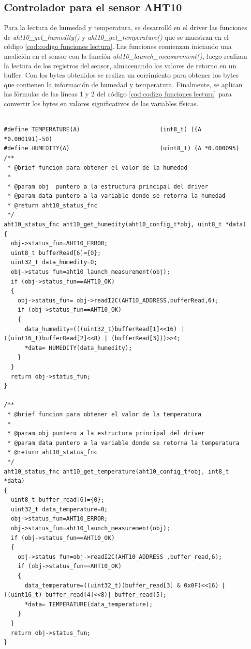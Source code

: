 \subsection{Controlador para el sensor AHT10} 

Para la lectura de humedad y temperatura, se desarrolló en el driver las funciones de \emph{aht10\_get\_humedity()} y \emph{aht10\_get\_temperature()} que se muestran en el código \ref{cod:codigo funciones lectura}.
Las funciones comienzan iniciando una medición en el sensor con la función \emph{aht10\_launch\_measurement()}, luego realizan la lectura de los registros del sensor, almacenando los valores de retorno en un buffer. Con los bytes obtenidos se realiza un corrimiento para  obtener los bytes que contienen la información de humedad y temperatura. Finalmente, se aplican las fórmulas de las líneas 1 y 2 del código \ref{cod:codigo funciones lectura} para convertir los bytes en valores significativos de las variables físicas.
 
\begin{lstlisting}[label=cod:codigo funciones lectura ,caption=Funciones de lectura de humedad y temperatura.]  % Start your code-block

#define TEMPERATURE(A)                       (int8_t) ((A *0.000191)-50)       
#define HUMEDITY(A)                          (uint8_t) (A *0.000095)        
/**
 * @brief funcion para obtener el valor de la humedad
 * 
 * @param obj  puntero a la estructura principal del driver 
 * @param data puntero a la variable donde se retorna la humedad
 * @return aht10_status_fnc 
 */
aht10_status_fnc aht10_get_humedity(aht10_config_t*obj, uint8_t *data)
{
  obj->status_fun=AHT10_ERROR;
  uint8_t bufferRead[6]={0};
  uint32_t data_humedity=0;
  obj->status_fun=aht10_launch_measurement(obj);
  if (obj->status_fun==AHT10_OK)
  {
    obj->status_fun= obj->readI2C(AHT10_ADDRESS,bufferRead,6);
    if (obj->status_fun==AHT10_OK)
    {
      data_humedity=(((uint32_t)bufferRead[1]<<16) | ((uint16_t)bufferRead[2]<<8) | (bufferRead[3]))>>4;
      *data= HUMEDITY(data_humedity);
    }
  }
  return obj->status_fun;
}

/**
 * @brief funcion para obtener el valor de la temperatura
 * 
 * @param obj puntero a la estructura principal del driver 
 * @param data puntero a la variable donde se retorna la temperatura
 * @return aht10_status_fnc 
 */
aht10_status_fnc aht10_get_temperature(aht10_config_t*obj, int8_t *data)
{
  uint8_t buffer_read[6]={0};
  uint32_t data_temperature=0;
  obj->status_fun=AHT10_ERROR;
  obj->status_fun=aht10_launch_measurement(obj);
  if (obj->status_fun==AHT10_OK)
  {
    obj->status_fun=obj->readI2C(AHT10_ADDRESS ,buffer_read,6);
    if (obj->status_fun==AHT10_OK)
    {
      data_temperature=((uint32_t)(buffer_read[3] & 0x0F)<<16) | ((uint16_t) buffer_read[4]<<8)| buffer_read[5];
      *data= TEMPERATURE(data_temperature);
    }
  }
  return obj->status_fun;
}
\end{lstlisting}

